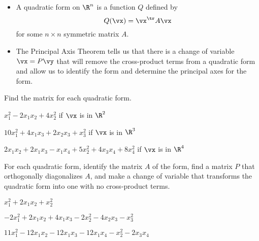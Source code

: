\label{sec:pat_summ}

\begin{itemize}
\item A quadratic form on $\R^n$ is a function $Q$ defined by
\[Q(\vx) = \vx^{\tr} A \vx\]
for some $n \times n$ symmetric matrix $A$.
\item The Principal Axis Theorem tells us that there is a change of variable $\vx = P\vy$ that will remove the cross-product terms from a quadratic form and allow us to identify the form and determine the principal axes for the form. 
\end{itemize}

\label{sec:pat_exer}

\be
\item Find the matrix for each quadratic form.
	\ba
	\item $x_1^2 - 2x_1x_2 + 4x_2^2$ if $\vx$ is in $\R^2$
	\item $10x_1^2 + 4x_1x_3 + 2x_2x_3 + x_3^2$ if $\vx$ is in $\R^3$
	\item $2x_1x_2 + 2x_1x_3 - x_1x_4 + 5x_2^2 + 4x_3x_4 + 8x_4^2$ if $\vx$ is in $\R^4$
	\ea
	
\item For each quadratic form, identify the matrix $A$ of the form, find a matrix $P$ that orthogonally diagonalizes $A$, and make a change of variable that transforms the quadratic form into one with no cross-product terms. 
	\ba
	\item $x_1^2+2x_1x_2+x_2^2$
	\item $-2x_1^2+2x_1x_2+4x_1x_3-2x_2^2-4x_2x_3-x_3^2$
	\item $11x_1^2-12x_1x_2-12x_1x_3-12x_1x_4-x_2^2-2x_3x_4$
	\ea


